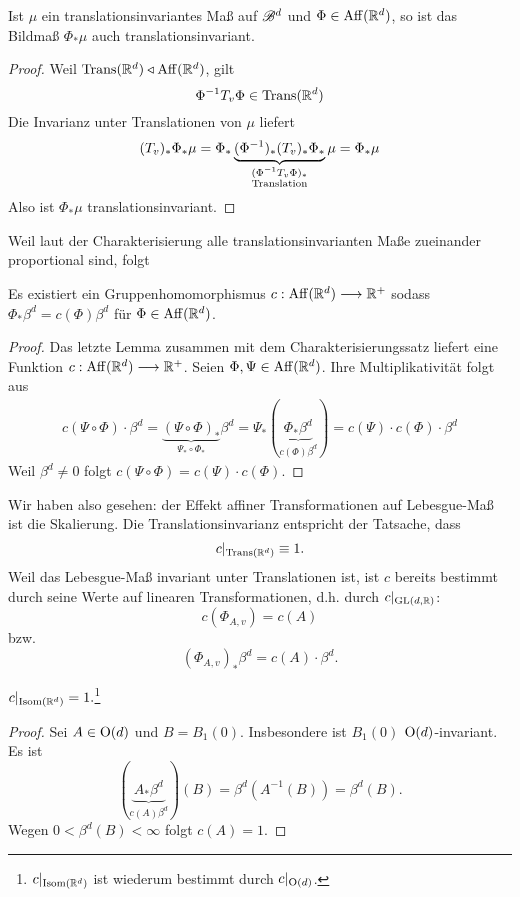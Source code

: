 \begin{lemma}
\begin{mdframed}
Ist $\mu$ ein translationsinvariantes Maß auf $\mathscr{B}^d$ und $\Phi \in \operatorname{Aff}(\mathbb{R}^d)$, so ist das Bildmaß $\Phi_*\mu$ auch translationsinvariant.
\end{mdframed}
\begin{proof}
Weil $\operatorname{Trans}(\mathbb{R}^d) \triangleleft \operatorname{Aff}(\mathbb{R}^d)$, gilt
$$
\Phi^{-1} T_v \Phi \in \operatorname{Trans}(\mathbb{R}^d)
$$
Die Invarianz unter Translationen von $\mu$ liefert
$$
(T_v)_*\Phi_*\mu=  \Phi_* \underbrace{(\Phi^{-1})_*(T_v)_*\Phi_*}_{\substack{(\Phi^{-1}T_v\Phi)_*\\ \text{Translation}}}\mu = \Phi_* \mu
$$
Also ist $\Phi_*\mu$ translationsinvariant.
\end{proof}
\end{lemma}

Weil laut der Charakterisierung alle translationsinvarianten Maße zueinander proportional sind, folgt
\begin{korollar}
\begin{mdframed}
Es existiert ein Gruppenhomomorphismus $c:\operatorname{Aff}(\mathbb{R}^d)\longrightarrow \mathbb{R}^+$ sodass 
$\Phi_*\beta^d = c(\Phi)\beta^d$ für $\Phi \in \operatorname{Aff}(\mathbb{R}^d)$.
\end{mdframed}
\begin{proof}
Das letzte Lemma zusammen mit dem Charakterisierungssatz liefert eine Funktion $c:\operatorname{Aff}(\mathbb{R}^d)\longrightarrow \mathbb{R}^+$. Seien $\Phi,\Psi \in \operatorname{Aff}(\mathbb{R}^d)$. Ihre Multiplikativität folgt aus
\begin{equation*}
\begin{split}
c(\Psi \circ \Phi) \cdot \beta^d = \underbrace{(\Psi \circ \Phi)_*}_{\Psi_*\circ\Phi_*} \beta^d= \Psi_*(\underbrace{\Phi_*\beta^d}_{c(\Phi)\beta^d}) = c(\Psi) \cdot c(\Phi) \cdot \beta^d
\end{split}
\end{equation*}
Weil $\beta^d \neq 0$ folgt $c(\Psi \circ \Phi)=c(\Psi)\cdot c(\Phi)$.
\end{proof}
\end{korollar}



Wir haben also gesehen: der Effekt affiner Transformationen auf Lebesgue-Maß ist die Skalierung. Die Translationsinvarianz entspricht der Tatsache, dass 
$$ c|_{\operatorname{Trans}(\mathbb{R}^d)} \equiv 1.$$
Weil das Lebesgue-Maß invariant unter Translationen ist, ist $c$ bereits bestimmt durch seine Werte auf linearen Transformationen, d.h. durch $c|_{\operatorname{GL}(d,\mathbb{R})}$:
$$c(\Phi_{A,v})=c(A)$$
bzw.
$$(\Phi_{A,v})_* \beta^d = c(A) \cdot \beta^d.$$
\begin{lemma}
${c|_{\operatorname{Isom}(\mathbb{R}^d)}=1}.$\footnote{$c|_{\operatorname{Isom}(\mathbb{R}^d)}$ ist wiederum bestimmt durch $c|_{\operatorname{O}(d)}$.}
\begin{proof}
Sei $A \in \operatorname{O}(d)$ und $B = B_1(0)$. Insbesondere ist $B_1(0)$ $\operatorname{O}(d)$-invariant. Es ist
$$
(\underbrace{A_*\beta^d}_{c(A)\beta^d})(B)= \beta^d (A^{-1}(B)) = \beta^d(B).
$$
Wegen $0<\beta^d(B)<\infty$ folgt $c(A)=1$.
\end{proof}
\end{lemma}


